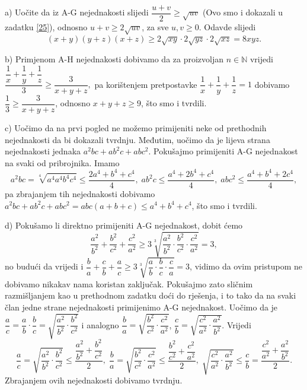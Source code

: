 \documentclass{book}
\renewenvironment{proof}{%
    \vspace{-\parskip}\begin{oldproof}%
    }{%
    \end{oldproof}%
}
\theoremstyle{definition}
\theoremstyle{definition}
\theoremstyle{remark}
\begin{document}
\begin{proof}[Rješenje]
a) Uočite da iz A-G nejednakosti slijedi $\dfrac{u+v}{2}\geq \sqrt{uv}$ (Ovo smo i dokazali u zadatku \ref{25}), odnosno $u+v\geq 2\sqrt{uv}$, za sve $u, v\geq 0$. Odavde slijedi
$$(x+y)(y+z)(x+z)\geq 2\sqrt{xy}\cdot 2\sqrt{yz}\cdot 2\sqrt{xz}=8xyz.$$

b) Primjenom A-H nejednakosti dobivamo da za proizvoljan $n\in \mathbb{N}$ vrijedi
$\dfrac{\dfrac{1}{x}+\dfrac{1}{y}+\dfrac{1}{z}}{3}\geq \dfrac{3}{x+y+z},$
pa korištenjem pretpostavke $\dfrac{1}{x}+\dfrac{1}{y}+\dfrac{1}{z}=1$ dobivamo $\dfrac{1}{3}\geq\dfrac{3}{x+y+z}$, odnosno $x+y+z\geq 9$, što smo i tvrdili.

c) Uočimo da na prvi pogled ne možemo primijeniti neke od prethodnih nejednakosti da bi dokazali tvrdnju. Međutim, uočimo da je lijeva strana nejednakosti jednaka $a^2bc+ab^2c+abc^2$. Pokušajmo primijeniti A-G nejednakost na svaki od pribrojnika. Imamo
$$a^2bc=\sqrt[4]{a^4a^4b^4c^4}\leq \dfrac{2a^4+b^4+c^4}{4},\;ab^2c\leq \dfrac{a^4+2b^4+c^4}{4},\;abc^2\leq \dfrac{a^4+b^4+2c^4}{4},$$
pa zbrajanjem tih nejednakosti dobivamo $a^2bc+ab^2c+abc^2=abc(a+b+c)\leq a^4+b^4+c^4$, što smo i tvrdili.

d) Pokušamo li direktno primijeniti A-G nejednakost, dobit ćemo
$$\dfrac{a^2}{b^2}+\dfrac{b^2}{c^2}+\dfrac{c^2}{a^2}\geq 3\sqrt[3]{\dfrac{a^2}{b^2}\cdot \dfrac{b^2}{c^2}\cdot \dfrac{c^2}{a^2}}=3,$$
no budući da vrijedi i $\dfrac{b}{a}+\dfrac{c}{b}+\dfrac{a}{c}\geq 3\sqrt[3]{\dfrac{a}{b}\cdot \dfrac{b}{c}\cdot \dfrac{c}{a}}=3$, vidimo da ovim pristupom ne dobivamo nikakav nama koristan zaključak. Pokušajmo zato sličnim razmišljanjem kao u prethodnom zadatku doći do rješenja, i to tako da na svaki član jedne strane nejednakosti primijenimo A-G nejednakost. Uočimo da je $\dfrac{a}{c}=\dfrac{a}{b}\cdot \dfrac{b}{c}=\sqrt{\dfrac{a^2}{b^2}\cdot\dfrac{b^2}{c^2}}$ i analogno $\dfrac{b}{a}=\sqrt{\dfrac{b^2}{c^2}\cdot\dfrac{c^2}{a^2}}$, $\dfrac{c}{b}=\sqrt{\dfrac{c^2}{a^2}\cdot\dfrac{a^2}{b^2}}$. Vrijedi
$$\dfrac{a}{c}=\sqrt{\dfrac{a^2}{b^2}\cdot\dfrac{b^2}{c^2}}\leq \dfrac{\dfrac{a^2}{b^2}+\dfrac{b^2}{c^2}}{2},\; \dfrac{b}{a}=\sqrt{\dfrac{b^2}{c^2}\cdot\dfrac{c^2}{a^2}}\leq \dfrac{\dfrac{b^2}{c^2}+\dfrac{c^2}{a^2}}{2},\; \sqrt{\dfrac{c^2}{a^2}\cdot\dfrac{a^2}{b^2}}\leq \dfrac{c}{b}=\dfrac{\dfrac{c^2}{a^2}+\dfrac{a^2}{b^2}}{2}.$$
Zbrajanjem ovih nejednakosti dobivamo tvrdnju.


\end{proof}
\end{document}

